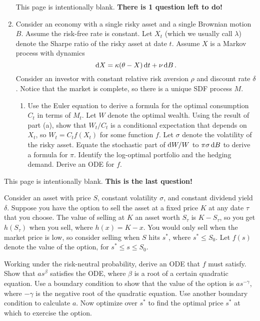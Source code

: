 \begin{enumerate}
\newpage\noindent This page is intentionally blank.  \textbf{There is 1 question left to do!}

\newpage\item Consider an economy with a single risky asset and a single Brownian motion $B$.  Assume the risk-free rate is constant.  Let $X_t$ (which we usually call $\lambda$) denote the Sharpe ratio of the risky asset at date $t$.  Assume $X$ is a Markov process with dynamics
$$\mathrm{d} X = \kappa(\theta-X)\,\mathrm{d} t + \nu\,\mathrm{d} B\,.$$
Consider an investor with constant relative risk aversion $\rho$ and discount rate $\delta$.  Notice that the market is complete, so there is a unique SDF process $M$.
\begin{enumerate}
\item Use the Euler equation to derive a formula for the optimal consumption $C_t$ in terms of $M_t$.
\im Let $W$ denote the optimal wealth.  Using the result of part (a), show that $W_t/C_t$ is a conditional expectation that depends on $X_t$, so $W_t = C_tf(X_t)$ for some function $f$.
\im Let $\sigma$ denote the volatility of the risky asset.  Equate the stochastic part of $\mathrm{d} W/W$ to $\pi \sigma\,\mathrm{d} B$ to derive a formula for $\pi$.  Identify the log-optimal portfolio and the hedging demand.
\im Derive an ODE for $f$.
\end{enumerate}





 
\end{enumerate}

\newpage\noindent This page is intentionally blank.  \textbf{This is the last question!}


\newpage\item  Consider an asset with price $S$, constant volatility $\sigma$, and constant dividend yield $\delta$.  Suppose you have the option to sell the asset at a fixed price $K$ at any date $\tau$ that you choose.  The value of selling at $K$ an asset worth $S_\tau$ is $K-S_\tau$, so you get $h(S_\tau)$ when you sell, where $h(x) = K-x$.  You would only sell when the market price is low, so consider selling when $S$ hits $s^*$, where $s^* \leq S_0$. Let $f(s)$ denote the value of the option, for $s^* \leq s \leq S_0$.
\begin{enumerate}
\im Working under the risk-neutral probability, derive an ODE that $f$ must satisfy.
\im Show that $as^\beta$ satisfies the ODE, where $\beta$ is a root of a certain quadratic equation.
\im Use a boundary condition to show that the value of the option is $as^{-\gamma}$, where $-\gamma$ is the negative root of the quadratic equation.  Use another boundary condition to calculate $a$.
\im Now optimize over $s^*$ to find the optimal price $s^*$ at which to exercise the option.
\end{enumerate}